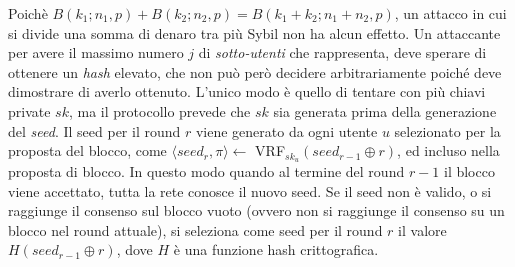 Poichè $B(k_1; n_1, p) + B(k_2; n_2, p) = B(k_1+k_2; n_1 + n_2, p)$, un attacco in cui si divide una somma di denaro tra più Sybil non ha alcun effetto.
Un attaccante per avere il massimo numero $j$ di \emph{sotto-utenti} che rappresenta, deve sperare di ottenere un \emph{hash} elevato, che non può però decidere arbitrariamente poiché deve dimostrare di averlo ottenuto. L'unico modo è quello di tentare con più chiavi private $sk$, ma il protocollo prevede che $sk$ sia generata prima della generazione del \emph{seed}.
Il seed per il round $r$ viene generato da ogni utente $u$ selezionato per la proposta del blocco, come $\langle seed_r, \pi \rangle \leftarrow$ VRF$_{sk_u}(seed_{r-1} \oplus r)$, ed incluso nella proposta di blocco. In questo modo quando al termine del round $r-1$ il blocco viene accettato, tutta la rete conosce il nuovo seed. Se il seed non è valido, o si raggiunge il consenso sul blocco vuoto (ovvero non si raggiunge il consenso su un blocco nel round attuale), si seleziona come seed per il round $r$ il valore $H(seed_{r-1} \oplus r)$, dove $H$ è una funzione hash crittografica.

